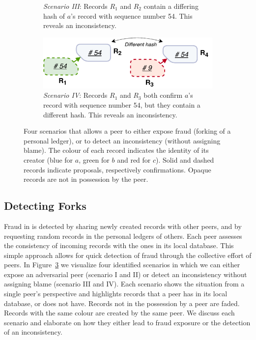 \begin{figure}[t!]
\begin{subfigure}[t]{.5\textwidth}
		\caption{\emph{Scenario III}: Records $ R_1 $ and $ R_2 $ contain a differing hash of $ a $'s record with sequence number 54. This reveals an inconsistency.}
		\label{fig:fraud_scenario_3}\vspace{0.9cm}
	\end{subfigure}
	\begin{subfigure}[t]{.6\textwidth}
		\centering
		\captionsetup{width=.89\linewidth}
		\includegraphics[width=.98\linewidth]{trustchain/assets/fraud_scenario_4}
		\caption{\emph{Scenario IV}: Records $ R_1 $ and $ R_3 $ both confirm $ a $'s record with sequence number 54, but they contain a different hash. This reveals an inconsistency.}
		\label{fig:fraud_scenario_4}
	\end{subfigure}
	\caption{Four scenarios that allows a peer to either expose fraud (forking of a personal ledger), or to detect an inconsistency (without assigning blame). The colour of each record indicates the identity of its creator (blue for $ a $, green for $ b $ and red for $ c $). Solid and dashed records indicate proposals, respectively confirmations. Opaque records are not in possession by the peer.}
	\label{fig:fraud_scenarios}
\end{figure}

\subsection{Detecting Forks}
\label{sec:detecting_forks}
Fraud in \TrustChain{} is detected by sharing newly created records with other peers, and by requesting random records in the personal ledgers of others.
Each peer assesses the consistency of incoming records with the ones in its local database.
This simple approach allows for quick detection of fraud through the collective effort of peers.
In Figure~\ref{fig:fraud_scenarios} we visualize four identified scenarios in which we can either expose an adversarial peer (scenario I and II) or detect an inconsistency without assigning blame (scenario III and IV).
Each scenario shows the situation from a single peer's perspective and highlights records that a peer has in its local database, or does not have.
Records not in the possession by a peer are faded.
Records with the same colour are created by the same peer.
We discuss each scenario and elaborate on how they either lead to fraud exposure or the detection of an inconsistency.

